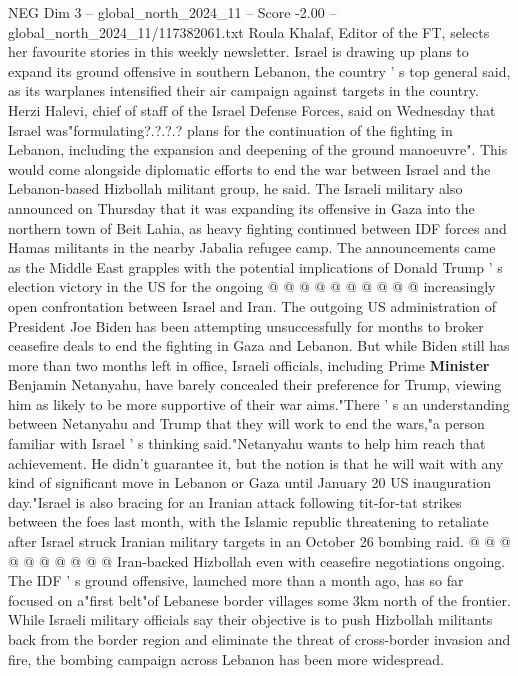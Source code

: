 \begin{textsample}{NEG Dim 3 – global\_north\_2024\_11 – Score -2.00 – global\_north\_2024\_11/117382061.txt}  \label{ex:f3_neg_276}
Roula Khalaf, Editor of the FT, selects her favourite stories in this weekly newsletter.
Israel is drawing up plans to expand its ground offensive in southern Lebanon, the country ' s top general said, as its warplanes intensified their air campaign against targets in the country.
Herzi Halevi, chief of staff of the Israel Defense Forces, said on Wednesday that Israel was"formulating?.?.?.? plans for the continuation of the fighting in Lebanon, including the expansion and deepening of the ground manoeuvre".
This would come alongside diplomatic efforts to end the war between Israel and the Lebanon-based Hizbollah militant group, he said.
The Israeli military also announced on Thursday that it was expanding its offensive in Gaza into the northern town of Beit Lahia, as heavy fighting continued between IDF forces and Hamas militants in the nearby Jabalia refugee camp.
The announcements came as the Middle East grapples with the potential implications of Donald Trump ' s election victory in the US for the ongoing @ @ @ @ @ @ @ @ @ @ increasingly open confrontation between Israel and Iran.
The outgoing US administration of President Joe Biden has been attempting unsuccessfully for months to broker ceasefire deals to end the fighting in Gaza and Lebanon.
But while Biden still has more than two months left in office, Israeli officials, including Prime \textbf{Minister} Benjamin Netanyahu, have barely concealed their preference for Trump, viewing him as likely to be more supportive of their war aims."There ' s an understanding between Netanyahu and Trump that they will work to end the wars,"a person familiar with Israel ' s thinking said."Netanyahu wants to help him reach that achievement.
He didn't guarantee it, but the notion is that he will wait with any kind of significant move in Lebanon or Gaza until January 20 US inauguration day."Israel is also bracing for an Iranian attack following tit-for-tat strikes between the foes last month, with the Islamic republic threatening to retaliate after Israel struck Iranian military targets in an October 26 bombing raid. @ @ @ @ @ @ @ @ @ @ Iran-backed Hizbollah even with ceasefire negotiations ongoing.
The IDF ' s ground offensive, launched more than a month ago, has so far focused on a"first belt"of Lebanese border villages some 3km north of the frontier.
While Israeli military officials say their objective is to push Hizbollah militants back from the border region and eliminate the threat of cross-border invasion and fire, the bombing campaign across Lebanon has been more widespread.

\end{textsample}
